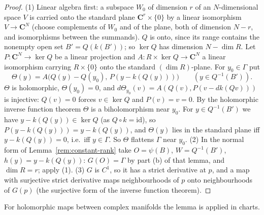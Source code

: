 \begin{proof}
\leanok
(1) Linear algebra first: a subspace \(W_0\) of dimension \(r\) of an \(N\)-dimensional space \(V\) is carried onto the standard plane \(\mathbf C^r\times\{0\}\) by a linear
isomorphism \(V\to\mathbf C^N\) (choose complements of \(W_0\) and of the plane, both of dimension \(N-r\), and isomorphisms between the summands). \(Q\) is onto, since
its range contains the nonempty open set \(B'=Q(k(B'))\); so \(\ker Q\) has dimension \(N-\dim R\). Let \(P\colon\mathbf C^N\to\ker Q\) be a linear projection and
\(A\colon R\times\ker Q\to\mathbf C^N\) a linear isomorphism carrying \(R\times\{0\}\) onto the standard \((\dim R)\)-plane. For \(y_0\in\Gamma\) put
\[
 \Theta(y)=A\bigl(Q(y)-Q(y_0),\,P(y-k(Q(y)))\bigr)\qquad(y\in Q^{-1}(B')).
\]
\(\Theta\) is holomorphic, \(\Theta(y_0)=0\), and \(d\Theta_{y_0}(v)=A(Q(v),P(v-dk(Qv)))\) is injective: \(Q(v)=0\) forces \(v\in\ker Q\) and \(P(v)=v=0\). By the
holomorphic inverse function theorem \(\Theta\) is a biholomorphism near \(y_0\). For \(y\in Q^{-1}(B')\) we have \(y-k(Q(y))\in\ker Q\) (as \(Q\circ k=\mathrm{id}\)), so
\(P(y-k(Q(y)))=y-k(Q(y))\), and \(\Theta(y)\) lies in the standard plane iff \(y-k(Q(y))=0\), i.e.\ iff \(y\in\Gamma\). So \(\Theta\) flattens \(\Gamma\) near \(y_0\).
(2) In the normal form of Lemma~\ref{rem:constant-rank} take \(O=\psi(B)\), \(W=Q^{-1}(B')\), \(h(y)=y-k(Q(y))\): \(G(O)=\Gamma\) by part (b) of that lemma, and
\(\dim R=r\); apply (1). (3) \(G\) is \(C^1\), so it has a strict derivative at \(p\), and a map with surjective strict derivative maps neighbourhoods of \(p\) onto
neighbourhoods of \(G(p)\) (the surjective form of the inverse function theorem).
\end{proof}
For holomorphic maps between complex manifolds the lemma is applied in charts.

